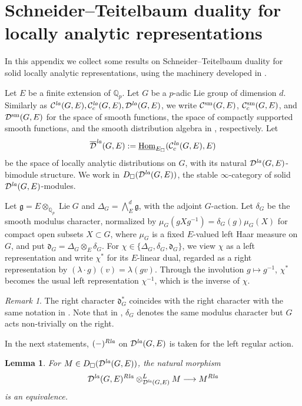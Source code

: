 \documentclass[a4paper,10pt]{amsart}
\theoremstyle{remark}
\newtheorem{remark}[theorem]{Remark}
\theoremstyle{definition}
\theoremstyle{plain}
\newtheorem{lemma}[theorem]{Lemma}
\numberwithin{equation}{section}
\newcommand{\bbQ}{{\mathbb Q}}
\newcommand{\calC}{{\mathcal C}}
\newcommand{\calD}{{\mathcal D}}
\newcommand{\Hom}{{\rm Hom}}
\newcommand{\la}{{\it la}}
\newcommand{\sm}{{\rm sm}}
\DeclareMathOperator{\Lie}{{Lie}}
\begin{document}
\clearpage \appendix
\section{Schneider--Teitelbaum duality for locally analytic representations}\label{sec:STdual}
In this appendix we collect some results on Schneider--Teitelbaum duality \cite{ST05} for solid locally analytic representations, using the machinery developed in \cite{rodrigues2022solid,JC23}.

Let $E$ be a finite extension of $\bbQ_p$.  Let $G$ be a $p$-adic Lie group of dimension $d$.  Similarly as $\calC^{\la}(G,E),\calC_c^{\la}(G,E),\calD^{\la}(G,E)$, we write $\calC^{\sm}(G,E)$, $\calC_c^{\sm}(G,E)$, and $\calD^{\sm}(G,E)$ for the space of smooth functions, the space of compactly supported smooth functions, and the smooth distribution algebra in \cite[\S~5]{JC23}, respectively. Let
\[
 \overline{\calD}^{\la}(G,E)
 :=\underline{\Hom}_{E_\square}(\calC_c^{\la}(G,E),E)
\]
be the space of locally analytic distributions on $G$, with its natural $\calD^{\la}(G,E)$-bimodule structure. We work in $D_{\square}(\calD^{\la}(G,E))$, the stable $\infty$-category of solid $\calD^{\la}(G,E)$-modules. 

Let $\mathfrak g=E\otimes_{\bbQ_p}\Lie G$ and $\Delta_G=\bigwedge_E^d\mathfrak g$, with the adjoint $G$-action.  Let $\delta_G$ be the smooth modulus character, normalized by $\mu_G(gXg^{-1})=\delta_G(g)\mu_G(X)$ for compact open subsets $X\subset G$, where $\mu_G$ is a fixed $E$-valued left Haar measure on $G$, and put $\mathfrak d_G=\Delta_G\otimes_E\delta_G$. For $\chi\in\{\Delta_G,\delta_G,\mathfrak d_G\}$, we view $\chi$ as a left representation and write $\chi^*$ for its $E$-linear dual, regarded as a right representation by $(\lambda\cdot g)(v)=\lambda(gv)$. Through the involution $g\mapsto g^{-1}$, $\chi^*$ becomes the usual left representation $\chi^{-1}$, which is the inverse of $\chi$. 
\begin{remark}
	The right character $\mathfrak d_G^*$ coincides with the right character with the same notation in \cite[Prop.~3.5]{ST05}. Note that in \cite[p.~301]{ST05}, $\delta_G$ denotes the same modulus character but $G$ acts non-trivially on the right.
\end{remark}
In the next statements, $(-)^{R\la}$ on $\calD^{\la}(G,E)$ is taken for the left regular action.
\begin{lemma}\label{lem:Rlaastensorkernel}
For $M\in D_{\square}(\calD^{\la}(G,E))$, the natural morphism
\[
 \calD^{\la}(G,E)^{R\la}
 \otimes^L_{\calD^{\la}(G,E)}M
 \longrightarrow M^{R\la}
\]
is an equivalence.
\end{lemma}
\end{document}

